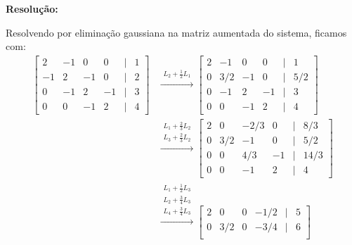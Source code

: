\documentclass[leqno]{article}
\newenvironment{sol}
{
    \vspace{4mm}
    \noindent\textbf{Resolução:}
    \strut\newline
    \smallskip
    \hspace{-3.5mm}
}
{}
\begin{document}
\begin{enumerate}
\begin{sol}
    Resolvendo por eliminação gaussiana na matriz aumentada do sistema, ficamos com:
    \begin{align*}
        \begin{bmatrix}
            2 & -1 & 0 & 0  & \mid & 1 \\
            -1 & 2 & -1 & 0 & \mid & 2 \\
            0 & -1 & 2 & -1 & \mid & 3 \\
            0 & 0 & -1 & 2  & \mid & 4
        \end{bmatrix}
        & \xrightarrow{
            \begin{array}{l}
                L_{ 2 } + \frac{ 1 }{ 2 } L_{ 1 }
            \end{array}
        }
        \begin{bmatrix}
            2 & -1 & 0 & 0  & \mid & 1 \\
            0 & 3/2 & -1 & 0 & \mid & 5/2 \\
            0 & -1 & 2 & -1 & \mid & 3 \\
            0 & 0 & -1 & 2  & \mid & 4
        \end{bmatrix} \\
        & \xrightarrow{
            \begin{array}{l}
                L_{ 1 } + \frac{ 2 }{ 3 }L_{ 2 } \\
                L_{ 3 } + \frac{ 2 }{ 3 }L_{ 2 }
            \end{array}
        }
        \begin{bmatrix}
            2 & 0 & -2/3 & 0  & \mid & 8/3 \\
            0 & 3/2 & -1 & 0 & \mid & 5/2 \\
            0 & 0 & 4/3 & -1 & \mid & 14/3 \\
            0 & 0 & -1 & 2  & \mid & 4
        \end{bmatrix} \\
        & \xrightarrow{
            \begin{array}{l}
                L_{ 1 } + \frac{ 1 }{ 2 } L_{ 3 } \\
                L_{ 2 } + \frac{ 3 }{ 4 } L_{ 3 } \\
                L_{ 4 } + \frac{ 3 }{ 4 } L_{ 3 }
            \end{array}
        }
        \begin{bmatrix}
            2 & 0 & 0 & -1/2  & \mid & 5 \\
            0 & 3/2 & 0 & -3/4 & \mid & 6 \\

\end{bmatrix}
\end{align*}
\end{sol}
\end{enumerate}
\end{document}
